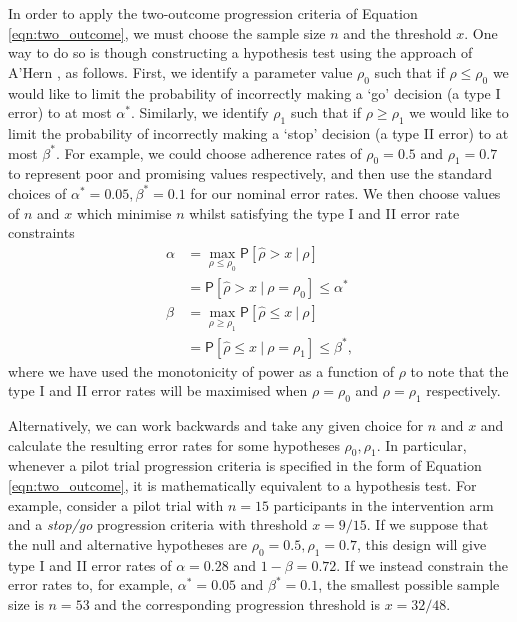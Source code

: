 \documentclass{bmcart}
\newcommand{\PR}{{\mathsf P}}
\begin{document}
In order to apply the two-outcome progression criteria of Equation \ref{eqn:two_outcome}, we must choose the sample size $n$ and the threshold $x$. One way to do so is though constructing a hypothesis test using the approach of A'Hern \cite{AHern2001}, as follows. First, we identify a parameter value $\rho_0$ such that if $\rho \leq \rho_0$ we would like to limit the probability of incorrectly making a `go' decision (a type I error) to at most $\alpha^*$. Similarly, we identify $\rho_1$ such that if $\rho \geq \rho_1$ we would like to limit the probability of incorrectly making a `stop' decision (a type II error) to at most $\beta^*$. For example, we could choose adherence rates of $\rho_0 = 0.5$ and $\rho_1 = 0.7$ to represent poor and promising values respectively, and then use the standard choices of $\alpha^* = 0.05, \beta^* = 0.1$ for our nominal error rates. We then choose values of $n$ and $x$ which minimise $n$ whilst satisfying the type I and II error rate constraints
\begin{align}
\alpha &= \max_{\rho \leq \rho_0} \PR[ \hat{\rho} > x ~ | ~ \rho] \\
&= \PR[ \hat{\rho} > x ~ | ~ \rho = \rho_0] \leq \alpha^* \\
\beta &= \max_{\rho \geq \rho_1} \PR[ \hat{\rho} \leq x ~ | ~ \rho] \\
&= \PR[ \hat{\rho} \leq x ~ | ~ \rho = \rho_1] \leq \beta^*,
\end{align}
where we have used the monotonicity of power as a function of $\rho$ to note that the type I and II error rates will be maximised when $\rho = \rho_0$ and $\rho = \rho_1$ respectively.

Alternatively, we can work backwards and take any given choice for $n$ and $x$ and calculate the resulting error rates for some hypotheses $\rho_0, \rho_1$. In particular, whenever a pilot trial progression criteria is specified in the form of Equation \ref{eqn:two_outcome}, it is mathematically equivalent to a hypothesis test. For example, consider a pilot trial with $n = 15$ participants in the intervention arm and a \emph{stop/go} progression criteria with threshold $x = 9/15$. If we suppose that the null and alternative hypotheses are $\rho_0 = 0.5, \rho_1 = 0.7$, this design will give type I and II error rates of $\alpha = 0.28$ and $1 - \beta = 0.72$. If we instead constrain the error rates to, for example, $\alpha^* = 0.05$ and $\beta^* = 0.1$, the smallest possible sample size is $n = 53$ and the corresponding progression threshold is $x = 32/48$. 
\end{document}
